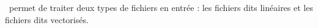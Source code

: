 \documentclass[manual-fr.tex]{subfiles}
\begin{document}
\SEM\ permet de traiter deux types de fichiers en entrée : les fichiers dits linéaires et les fichiers dits vectorisés.
\end{document}
